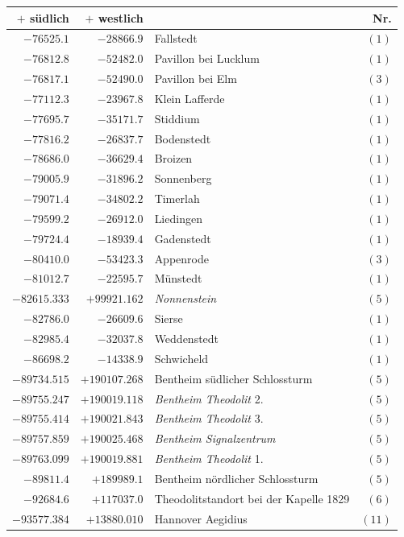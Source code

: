 \clearpage
\begin{center}\begingroup\fontsize{8}{9}\selectfont
\setlength{\tabcolsep}{4pt}
\begin{tabular}{r|r|p{170pt}|r}\hline
\(+\) südlich&\(+\) westlich&&Nr.\\\hline
\(-76525.1\)&\(-28866.9\)&Fallstedt&\((1)\)\\
\(-76812.8\)&\(-52482.0\)&Pavillon bei Lucklum&\((1)\)\\
\(-76817.1\)&\(-52490.0\)&Pavillon bei Elm&\((3)\)\\
\(-77112.3\)&\(-23967.8\)&Klein Lafferde&\((1)\)\\
\(-77695.7\)&\(-35171.7\)&Stiddium&\((1)\)\\
\(-77816.2\)&\(-26837.7\)&Bodenstedt&\((1)\)\\
\(-78686.0\)&\(-36629.4\)&Broizen&\((1)\)\\
\(-79005.9\)&\(-31896.2\)&Sonnenberg&\((1)\)\\
\(-79071.4\)&\(-34802.2\)&Timerlah&\((1)\)\\
\(-79599.2\)&\(-26912.0\)&Liedingen&\((1)\)\\
\(-79724.4\)&\(-18939.4\)&Gadenstedt&\((1)\)\\
\(-80410.0\)&\(-53423.3\)&Appenrode&\((3)\)\\
\(-81012.7\)&\(-22595.7\)&Münstedt&\((1)\)\\
\(-82615.333\)&\(+99921.162\)&\textit{Nonnenstein}&\((5)\)\\
\(-82786.0\)&\(-26609.6\)&Sierse&\((1)\)\\
\(-82985.4\)&\(-32037.8\)&Weddenstedt&\((1)\)\\
\(-86698.2\)&\(-14338.9\)&Schwicheld&\((1)\)\\
\(-89734.515\)&\(+190107.268\)&Bentheim südlicher Schlossturm&\((5)\)\\
\(-89755.247\)&\(+190019.118\)&\textit{Bentheim Theodolit} 2.&\((5)\)\\
\(-89755.414\)&\(+190021.843\)&\textit{Bentheim Theodolit} 3.&\((5)\)\\
\(-89757.859\)&\(+190025.468\)&\textit{Bentheim Signalzentrum}&\((5)\)\\
\(-89763.099\)&\(+190019.881\)&\textit{Bentheim Theodolit} 1.&\((5)\)\\
\(-89811.4\)&\(+189989.1\)&Bentheim nördlicher Schlossturm&\((5)\)\\
\(-92684.6\)&\(+117037.0\)&Theodolitstandort bei der Kapelle 1829&\((6)\)\\
\(-93577.384\)&\(+13880.010\)&Hannover Aegidius&\((11)\)\\

\end{tabular}
\end{center}
